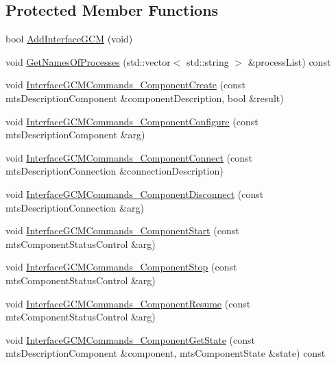\subsection*{Protected Member Functions}
\begin{DoxyCompactItemize}
\item 
bool \hyperlink{classmts_manager_component_server_a3384159cec50ef6169f8c8b38dcee9bd}{Add\+Interface\+G\+C\+M} (void)
\item 
void \hyperlink{classmts_manager_component_server_a12a96063cacc87c1d9d808fefbae6ac0}{Get\+Names\+Of\+Processes} (std\+::vector$<$ std\+::string $>$ \&process\+List) const 
\item 
void \hyperlink{classmts_manager_component_server_aaed93e634c3edb8108f6211bd409a05b}{Interface\+G\+C\+M\+Commands\+\_\+\+Component\+Create} (const mts\+Description\+Component \&component\+Description, bool \&result)
\item 
void \hyperlink{classmts_manager_component_server_ac1a005492dde62b258eadcdc5ec20232}{Interface\+G\+C\+M\+Commands\+\_\+\+Component\+Configure} (const mts\+Description\+Component \&arg)
\item 
void \hyperlink{classmts_manager_component_server_ae635792d3cd3fb4d84167e4ee149c664}{Interface\+G\+C\+M\+Commands\+\_\+\+Component\+Connect} (const mts\+Description\+Connection \&connection\+Description)
\item 
void \hyperlink{classmts_manager_component_server_a734eefb7e18ba05156a9ca1443a77b39}{Interface\+G\+C\+M\+Commands\+\_\+\+Component\+Disconnect} (const mts\+Description\+Connection \&arg)
\item 
void \hyperlink{classmts_manager_component_server_afe4917628e2e91dfe20fffafc43fe746}{Interface\+G\+C\+M\+Commands\+\_\+\+Component\+Start} (const mts\+Component\+Status\+Control \&arg)
\item 
void \hyperlink{classmts_manager_component_server_af2f4fc96e195cc1a7d5811a3fdb8e379}{Interface\+G\+C\+M\+Commands\+\_\+\+Component\+Stop} (const mts\+Component\+Status\+Control \&arg)
\item 
void \hyperlink{classmts_manager_component_server_a9029510ae1992a36feb9388dbceb098b}{Interface\+G\+C\+M\+Commands\+\_\+\+Component\+Resume} (const mts\+Component\+Status\+Control \&arg)
\item 
void \hyperlink{classmts_manager_component_server_ae42ed223d038117a5588bcc640d162ab}{Interface\+G\+C\+M\+Commands\+\_\+\+Component\+Get\+State} (const mts\+Description\+Component \&component, mts\+Component\+State \&state) const 

\end{DoxyCompactItemize}
